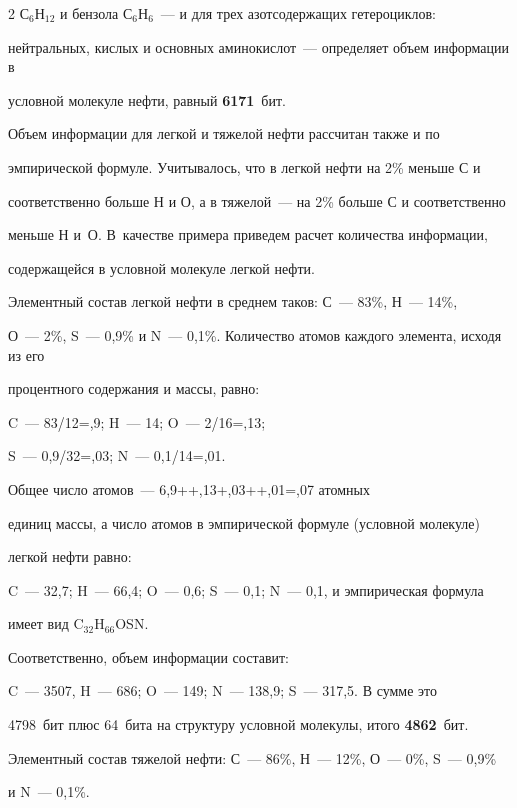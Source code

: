 \begin{multicols}{2}
С$_6$Н$_{12}$ и бензола С$_6$Н$_6$~--- и для трех азотсодержащих гетероциклов: 

нейтральных, кислых и основных аминокислот~--- определяет объем информации в 

условной молекуле нефти, равный \textbf{6171}~бит.

     

     Объем информации для легкой и тяжелой нефти рассчитан также и по 

эмпирической формуле. Учитывалось, что в легкой нефти на 2\% меньше С и 

соответственно больше Н и О, а в тяжелой~--- на 2\% больше С и соответственно 

меньше Н и~О. В~качестве примера приведем расчет количества информации, 

содержащейся в условной молекуле легкой нефти.

     

     Элементный состав легкой нефти в среднем таков: С~--- 83\%, Н~--- 14\%, 

О~--- 2\%, S~--- 0,9\% и N~--- 0,1\%. Количество атомов каждого элемента, исходя из его 

процентного содержания и массы, равно: 

C~--- 83/12\;=,9; H~--- 14; O~--- 2/16\;=,13;

S~--- 0{,}9/32\;=,03; N~--- 0,1/14\;=,01.

     Общее число атомов~--- 6,9\;+\;+,13\;+,03\;+\linebreak +,01\;=,07 атомных 

единиц массы, а число атомов в эмпирической формуле (условной молекуле) 

легкой нефти равно:

     C~--- 32,7; H~--- 66,4; O~--- 0,6; S~--- 0,1; N~--- 0,1, и эмпирическая формула 

имеет вид C$_{32}$H$_{66}$OSN.

     

     Соответственно, объем информации составит:

     C~--- 3507, H~--- 686; O~--- 149; N~--- 138,9; S~--- 317,5. В сумме это 

4798~бит плюс 64~бита на структуру условной молекулы, итого \textbf{4862}~бит. 

     

     Элементный состав тяжелой нефти: С~--- 86\%, Н~--- 12\%, О~--- 0\%, S~--- 0,9\% 

и N~--- 0,1\%.


\end{multicols}
